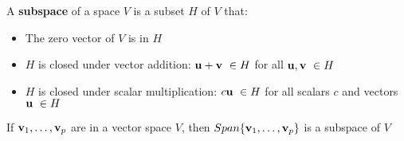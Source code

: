 \documentclass{report}
\begin{document}
\begin{definition}
    A \textbf{subspace} of a space $V$ is a subset $H$ of $V$ that:
    \begin{itemize}
        \item The zero vector of $V$ is in $H$
        \item $H$ is closed under vector addition: $\uu + \vv \ \in H$ for all $\mathbf{u}, \mathbf{v} \ \in H$
        \item $H$ is closed under scalar multiplication: $c\uu \ \in H$ for all scalars $c$ and vectors $\mathbf{u}\ \in H$
    \end{itemize}
\end{definition}

\begin{theorem}
    If $\mathbf{v}_1, \ldots, \mathbf{v}_p$ are in a vector space $V$, then $Span \{\mathbf{v}_1, \ldots, \mathbf{v}_p\}$ is a subspace of $V$
\end{theorem}
\end{document}
